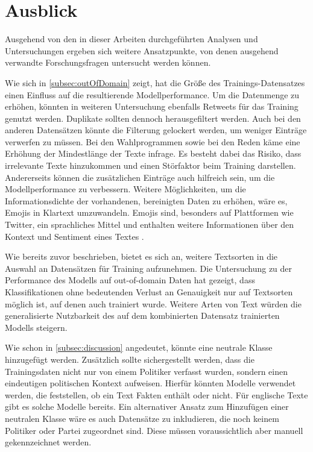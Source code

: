 
\section{Ausblick}

Ausgehend von den in dieser Arbeiten durchgeführten Analysen und Untersuchungen ergeben sich weitere Ansatzpunkte, von denen ausgehend verwandte Forschungsfragen untersucht werden können.

Wie sich in \autoref{subsec:outOfDomain} zeigt, hat die Größe des Trainings-Datensatzes einen Einfluss auf die resultierende Modellperformance. Um die Datenmenge zu erhöhen, könnten in weiteren Untersuchung ebenfalls Retweets für das Training genutzt werden. Duplikate sollten dennoch herausgefiltert werden. Auch bei den anderen Datensätzen könnte die Filterung gelockert werden, um weniger Einträge verwerfen zu müssen. Bei den Wahlprogrammen sowie bei den Reden käme eine Erhöhung der Mindestlänge der Texte infrage. Es besteht dabei das Risiko, dass irrelevante Texte hinzukommen und einen Störfaktor beim Training darstellen. Andererseits können die zusätzlichen Einträge auch hilfreich sein, um die Modellperformance zu verbessern. Weitere Möglichkeiten, um die Informationsdichte der vorhandenen, bereinigten Daten zu erhöhen, wäre es, Emojis in Klartext umzuwandeln. Emojis sind, besonders auf Plattformen wie Twitter, ein sprachliches Mittel und enthalten weitere Informationen über den Kontext und Sentiment eines Textes \autocite{guhr_training_2020}.

Wie bereits zuvor beschrieben, bietet es sich an, weitere Textsorten in die Auswahl an Datensätzen für Training aufzunehmen. Die Untersuchung zu der Performance des \ft Modells auf out-of-domain Daten hat gezeigt, dass Klassifikationen ohne bedeutenden Verlust an Genauigkeit nur auf Textsorten möglich ist, auf denen auch trainiert wurde. Weitere Arten von Text würden die generalisierte Nutzbarkeit des auf dem kombinierten Datensatz trainierten Modells steigern.

Wie schon in \autoref{subsec:discussion} angedeutet, könnte eine neutrale Klasse hinzugefügt werden. Zusätzlich sollte sichergestellt werden, dass die Trainingsdaten nicht nur von einem Politiker verfasst wurden, sondern einen eindeutigen politischen Kontext aufweisen. Hierfür könnten Modelle verwendet werden, die feststellen, ob ein Text Fakten enthält oder nicht. Für englische Texte gibt es solche Modelle bereits. Ein alternativer Ansatz zum Hinzufügen einer neutralen Klasse wäre es auch Datensätze zu inkludieren, die noch keinem Politiker oder Partei zugeordnet sind. Diese müssen voraussichtlich aber manuell gekennzeichnet werden.

